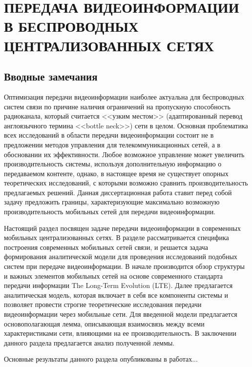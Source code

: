 \chapter{ПЕРЕДАЧА ВИДЕОИНФОРМАЦИИ В БЕСПРОВОДНЫХ ЦЕНТРАЛИЗОВАННЫХ СЕТЯХ}
\label{chap2}

\section{Вводные замечания}
\label{chap2:Intro}

Оптимизация передачи видеоинформации наиболее актуальна для беспроводных систем связи по причине наличия ограничений на пропускную способность радиоканала, который считается <<узким местом>> (адаптированный перевод англоязычного термина <<bottle neck>>) сети в целом. Основная проблематика всех исследований в области передачи видеоинформации состоит не в предложении методов управления для телекоммуникационных сетей, а в обосновании их эффективности. Любое возможное управление может увеличить производительность системы, используя дополнительную информацию о передаваемом контенте, однако, в настоящее время не существует опорных теоретических исследований, с которыми возможно сравнить производительность предлагаемых решений. Данная диссертационная работа ставит перед собой задачу предложить границы, характеризующие максимально возможную производительность мобильных сетей для передачи видеоинформации.

Настоящий раздел посвящен задаче передачи видеоинформации в современных мобильных централизованных сетях. В разделе рассматривается специфика построения современных мобильных сетей связи, и решается задача формирования аналитической модели для проведения исследований подобных систем при передаче видеоинформации. В начале производится обзор структуры и важных элементов мобильных сетей на основе современного стандарта передачи информации The Long-Term Evolution (LTE). Далее предлагается аналитическая модель, которая включает в себя все компоненты системы и позволяет провести строгие теоретические исследования передачи видеоинформации через мобильные сети. Для введенной модели предлагается основополагающая лемма, описывающая взаимосвязь между всеми характеристиками сети, влияющими на ее производительность. В заключении данного раздела предлагается анализ полученной леммы.

Основные результаты данного раздела опубликованы в работах...

